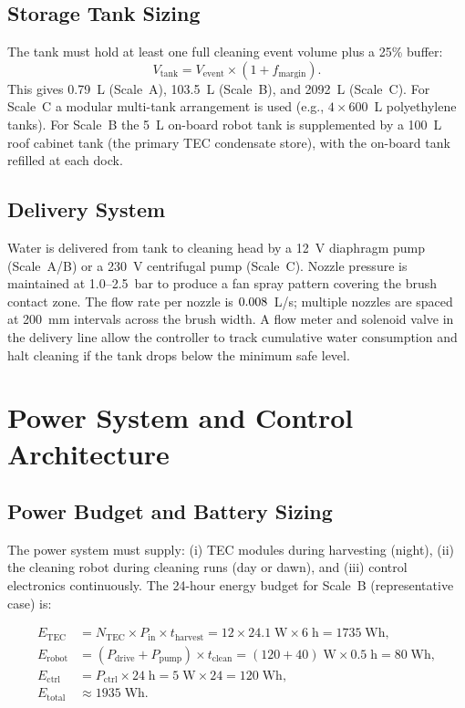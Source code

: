 \documentclass[12pt,a4paper]{report}   %
\begin{document}
\section{Storage Tank Sizing}

The tank must hold at least one full cleaning event volume plus a 25\% buffer:
\begin{equation}
  V_{\mathrm{tank}} = V_{\mathrm{event}} \times (1 + f_{\mathrm{margin}}).
\end{equation}
This gives 0.79~L (Scale~A), 103.5~L (Scale~B), and 2092~L (Scale~C). For Scale~C a modular
multi-tank arrangement is used (e.g., $4 \times 600$~L polyethylene tanks). For Scale~B the
5~L on-board robot tank is supplemented by a 100~L roof cabinet tank (the primary TEC
condensate store), with the on-board tank refilled at each dock.

\section{Delivery System}

Water is delivered from tank to cleaning head by a 12~V diaphragm pump (Scale~A/B) or a
230~V centrifugal pump (Scale~C). Nozzle pressure is maintained at 1.0--2.5~bar to produce
a fan spray pattern covering the brush contact zone. The flow rate per nozzle is
$0.008$~L/s; multiple nozzles are spaced at 200~mm intervals across the brush width.
A flow meter and solenoid valve in the delivery line allow the controller to track cumulative
water consumption and halt cleaning if the tank drops below the minimum safe level.

\chapter{Power System and Control Architecture}

\section{Power Budget and Battery Sizing}

The power system must supply: (i) TEC modules during harvesting (night), (ii) the cleaning robot
during cleaning runs (day or dawn), and (iii) control electronics continuously. The 24-hour energy
budget for Scale~B (representative case) is:

\begin{align*}
  E_{\mathrm{TEC}} &= N_{\mathrm{TEC}} \times P_{\mathrm{in}} \times t_{\mathrm{harvest}}
  = 12 \times 24.1\;\text{W} \times 6\;\text{h} = 1735\;\text{Wh}, \\
  E_{\mathrm{robot}} &= (P_{\mathrm{drive}} + P_{\mathrm{pump}})\times t_{\mathrm{clean}}
  = (120 + 40)\;\text{W} \times 0.5\;\text{h} = 80\;\text{Wh}, \\
  E_{\mathrm{ctrl}} &= P_{\mathrm{ctrl}} \times 24\;\text{h} = 5\;\text{W} \times 24 = 120\;\text{Wh}, \\
  E_{\mathrm{total}} &\approx 1935\;\text{Wh}.
\end{align*}
\end{document}
